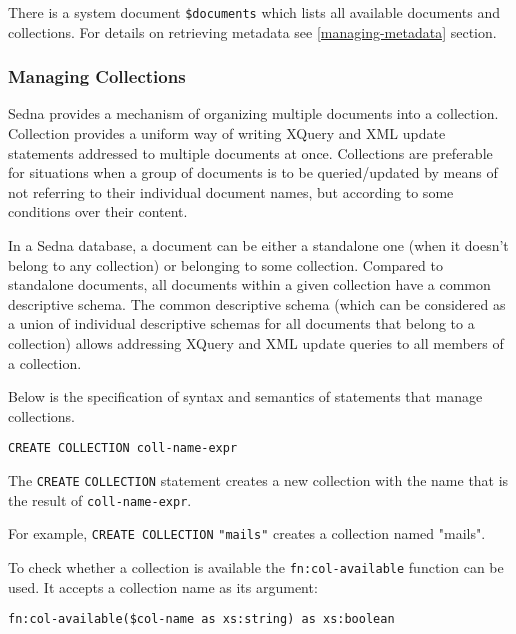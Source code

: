 \documentclass[a4paper,12pt]{article}
\begin{document}
There is a system document \verb!$documents! which lists all available documents
and collections. For details on retrieving metadata see \ref{managing-metadata}
section.


\subsubsection{Managing Collections}

Sedna provides a mechanism of organizing multiple documents into a collection.
Collection provides a uniform way of writing XQuery and XML update statements
addressed to multiple documents at once. Collections are preferable for
situations when a group of documents is to be queried/updated by means of not
referring to their individual document names, but according to some conditions
over their content.

In a Sedna database, a document can be either a standalone one (when it doesn't
belong to any collection) or belonging to some collection. Compared to
standalone documents, all documents within a given collection have a common
descriptive schema. The common descriptive schema (which can be considered as a
union of individual descriptive schemas for all documents that belong to a
collection) allows addressing XQuery and XML update queries to all members of a
collection.

Below is the specification of syntax and semantics of statements that manage
collections.

\begin{verbatim}
CREATE COLLECTION coll-name-expr
\end{verbatim}

The \verb!CREATE! \verb!COLLECTION! statement creates a new collection with the
name that is the result of \verb!coll-name-expr!.

For example, \verb!CREATE COLLECTION! \verb!"mails"! creates a collection named
"mails".

To check whether a collection is available the \verb!fn:col-available! function
can be used. It accepts a collection name as its argument:
\begin{verbatim}
fn:col-available($col-name as xs:string) as xs:boolean
\end{verbatim}
\end{document}
